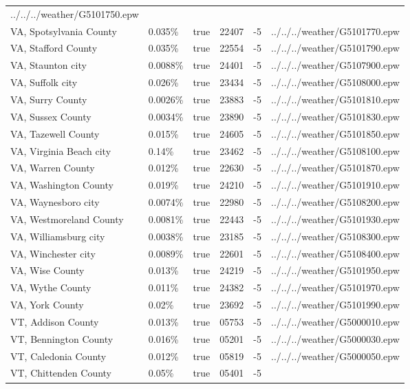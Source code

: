 \begin{longtable}[]{@{}llllll@{}}
../../../weather/G5101750.epw \\
VA, Spotsylvania County & 0.035\% & true & 22407 & -5 &
../../../weather/G5101770.epw \\
VA, Stafford County & 0.035\% & true & 22554 & -5 &
../../../weather/G5101790.epw \\
VA, Staunton city & 0.0088\% & true & 24401 & -5 &
../../../weather/G5107900.epw \\
VA, Suffolk city & 0.026\% & true & 23434 & -5 &
../../../weather/G5108000.epw \\
VA, Surry County & 0.0026\% & true & 23883 & -5 &
../../../weather/G5101810.epw \\
VA, Sussex County & 0.0034\% & true & 23890 & -5 &
../../../weather/G5101830.epw \\
VA, Tazewell County & 0.015\% & true & 24605 & -5 &
../../../weather/G5101850.epw \\
VA, Virginia Beach city & 0.14\% & true & 23462 & -5 &
../../../weather/G5108100.epw \\
VA, Warren County & 0.012\% & true & 22630 & -5 &
../../../weather/G5101870.epw \\
VA, Washington County & 0.019\% & true & 24210 & -5 &
../../../weather/G5101910.epw \\
VA, Waynesboro city & 0.0074\% & true & 22980 & -5 &
../../../weather/G5108200.epw \\
VA, Westmoreland County & 0.0081\% & true & 22443 & -5 &
../../../weather/G5101930.epw \\
VA, Williamsburg city & 0.0038\% & true & 23185 & -5 &
../../../weather/G5108300.epw \\
VA, Winchester city & 0.0089\% & true & 22601 & -5 &
../../../weather/G5108400.epw \\
VA, Wise County & 0.013\% & true & 24219 & -5 &
../../../weather/G5101950.epw \\
VA, Wythe County & 0.011\% & true & 24382 & -5 &
../../../weather/G5101970.epw \\
VA, York County & 0.02\% & true & 23692 & -5 &
../../../weather/G5101990.epw \\
VT, Addison County & 0.013\% & true & 05753 & -5 &
../../../weather/G5000010.epw \\
VT, Bennington County & 0.016\% & true & 05201 & -5 &
../../../weather/G5000030.epw \\
VT, Caledonia County & 0.012\% & true & 05819 & -5 &
../../../weather/G5000050.epw \\
VT, Chittenden County & 0.05\% & true & 05401 & -5 &

\end{longtable}
